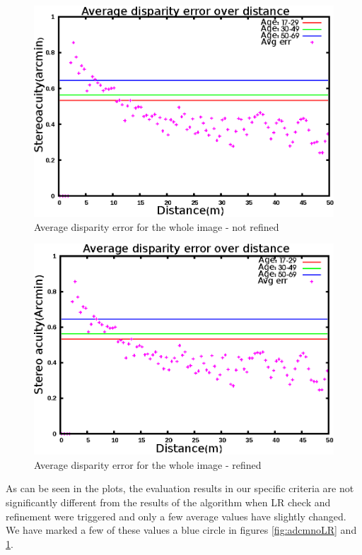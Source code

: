 \begin{figure}[H]
\centering
\includegraphics[scale=0.8]{adcenfull3NoLR}
\caption{Average disparity error for the whole image - not refined}
\label{fig:adcfnoLR}
\end{figure} 

\begin{figure}[H]
\centering
\includegraphics[scale=0.8]{adcenfull3}
\caption{Average disparity error for the whole image - refined}
\label{fig:adcf3}
\end{figure} 

As can be seen in the plots, the evaluation results in our specific criteria 
are not significantly different from the results of the algorithm when LR check and refinement were triggered
and only a few average values have slightly changed. We have marked a few of these values a blue circle in figures \ref{fig:adcmnoLR} and \ref{fig:adcfnoLR}.

